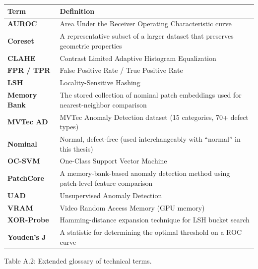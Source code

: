 \documentclass[12pt, a4paper, oneside]{report}
\begin{document}
{\def\LTcaptype{none} %
\begin{longtable}[]{@{}ll@{}}
\toprule\noalign{}
Term & Definition \\
\midrule\noalign{}
\endhead
\bottomrule\noalign{}
\endlastfoot
\textbf{AUROC} & Area Under the Receiver Operating Characteristic curve \\
\textbf{Coreset} & A representative subset of a larger dataset that preserves geometric properties \\
\textbf{CLAHE} & Contrast Limited Adaptive Histogram Equalization \\
\textbf{FPR / TPR} & False Positive Rate / True Positive Rate \\
\textbf{LSH} & Locality-Sensitive Hashing \\
\textbf{Memory Bank} & The stored collection of nominal patch embeddings used for nearest-neighbor comparison \\
\textbf{MVTec AD} & MVTec Anomaly Detection dataset (15 categories, 70+ defect types) \\
\textbf{Nominal} & Normal, defect-free (used interchangeably with ``normal'' in this thesis) \\
\textbf{OC-SVM} & One-Class Support Vector Machine \\
\textbf{PatchCore} & A memory-bank-based anomaly detection method using patch-level feature comparison \\
\textbf{UAD} & Unsupervised Anomaly Detection \\
\textbf{VRAM} & Video Random Access Memory (GPU memory) \\
\textbf{XOR-Probe} & Hamming-distance expansion technique for LSH bucket search \\
\textbf{Youden's J} & A statistic for determining the optimal threshold on a ROC curve \\
\end{longtable}
}

Table A.2: Extended glossary of technical terms.

\bigskip\noindent\hrulefill\bigskip
\end{document}
